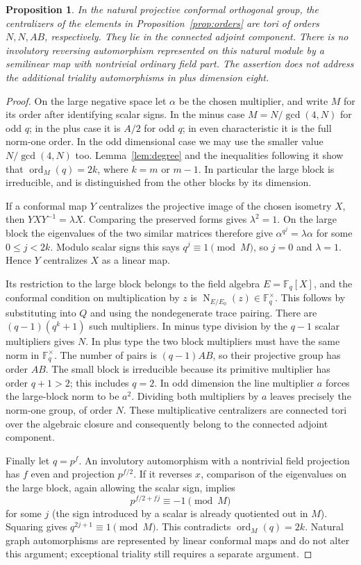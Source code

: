 \documentclass[11pt,a4paper]{article}
\newtheorem{proposition}[lemma]{Proposition}
\newcommand{\F}{\mathbb F}
\newcommand{\Norm}{\operatorname{N}}
\begin{document}
\begin{proposition}\label{prop:centralizer}
In the natural projective conformal orthogonal group, the centralizers
of the elements in Proposition~\ref{prop:orders} are tori of orders
$N,N,AB$, respectively. They lie in the connected adjoint component.
There is no involutory reversing automorphism represented on this
natural module by a semilinear map with nontrivial ordinary field part.
The assertion does not address the additional triality automorphisms
in plus dimension eight.
\end{proposition}
\begin{proof}
On the large negative space let $\alpha$ be the chosen multiplier, and
write $M$ for its order after identifying scalar signs. In the minus
case $M=N/\gcd(4,N)$ for odd $q$; in the plus case it is $A/2$ for odd
$q$; in even characteristic it is the full norm-one order. In the odd
dimensional case we may use the smaller value $N/\gcd(4,N)$ too.
Lemma~\ref{lem:degree} and the inequalities following it show that
$\operatorname{ord}_M(q)=2k$, where $k=m$ or $m-1$. In particular the
large block is irreducible, and is distinguished from the other blocks
by its dimension.

If a conformal map $Y$ centralizes the projective image of the chosen
isometry $X$, then $YXY^{-1}=\lambda X$. Comparing the preserved forms
gives $\lambda^2=1$. On the large block the eigenvalues of the two
similar matrices therefore give
$\alpha^{q^j}=\lambda\alpha$ for some $0\le j<2k$.
Modulo scalar signs this says $q^j\equiv1\pmod M$, so $j=0$ and
$\lambda=1$. Hence $Y$ centralizes $X$ as a linear map.

Its restriction to the large block belongs to the field algebra
$E=\F_q[X]$, and the conformal condition on multiplication by $z$ is
$\Norm_{E/E_0}(z)\in\F_q^\times$. This follows by substituting into
$Q$ and using the nondegenerate trace pairing. There are
$(q-1)(q^k+1)$ such multipliers. In minus type division by the $q-1$
scalar multipliers gives $N$.
In plus type the two block multipliers must have the same norm in
$\F_q^\times$. The number of pairs is $(q-1)AB$, so their projective
group has order $AB$. The small block is irreducible because its
primitive multiplier has order $q+1>2$; this includes $q=2$.
In odd dimension the line multiplier $a$ forces the large-block norm
to be $a^2$. Dividing both multipliers by $a$ leaves precisely the
norm-one group, of order $N$. These multiplicative centralizers are
connected tori over the algebraic closure and consequently belong to
the connected adjoint component.

Finally let $q=p^f$. An involutory automorphism with a nontrivial field
projection has $f$ even and projection $p^{f/2}$. If it reverses $x$,
comparison of the eigenvalues on the large block, again allowing the
scalar sign, implies
\[
 p^{f/2+fj}\equiv-1\pmod M
\]
for some $j$ (the sign introduced by a scalar is already quotiented
out in $M$). Squaring gives $q^{2j+1}\equiv1\pmod M$.
This contradicts $\operatorname{ord}_M(q)=2k$. Natural graph
automorphisms are represented by linear conformal maps and do not alter
this argument; exceptional triality still requires a separate argument.
\end{proof}
\end{document}
